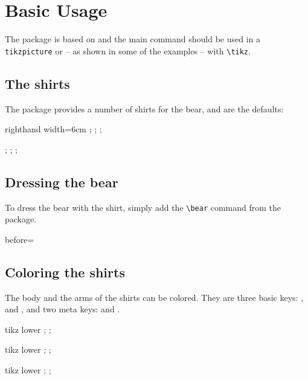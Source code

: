 \section{Basic Usage}

The package is based on \TikZ{} and the main command should be used in a \texttt{tikzpicture} or -- as shown in some of the examples -- with \verb+\tikz+.

\subsection{The shirts}
 The package provides a number of shirts for the bear,  and  are the defaults:
 \begin{tcblisting}{righthand width=6cm}
 \tikz{};
 \tikz\bearwear
   [t-shirt];
 \tikz{};

 \tikz\bearwear
   [v-neckline];
 \tikz{};
 \tikz{};
  \end{tcblisting}

 \subsection{Dressing the bear}

 To dress the bear with the shirt, simply add the \verb+\bear+ command from the  package.

 \begin{tcblisting}{before=\nopagebreak}
 \tikz{\bear;\bearwear[v-neckline];}
  \end{tcblisting}

 \subsection{Coloring the shirts}

 The body and the arms of the shirts can be colored. They are three basic keys: ,  and , and two meta keys:  and .

 \begin{tcblisting}{tikz lower}
  \bear;
  \bearwear
    [v-neckline,
     leftarm=red,
     rightarm=green,
     body=blue];
 \end{tcblisting}
 \begin{tcblisting}{tikz lower}
  \bear;
  \bearwear[arms=green];
 \end{tcblisting}
 \begin{tcblisting}{tikz lower}
  \bear;
  \bearwear
    [shirt=
      {shade,
       top color=blue,
       bottom color=red}];
 \end{tcblisting}


